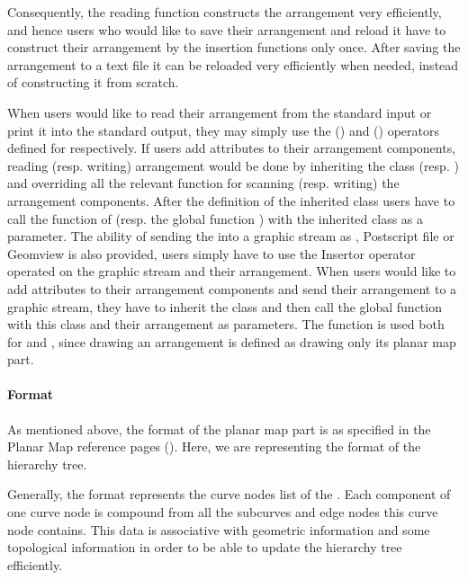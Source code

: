 \begin{ccAdvanced}
Consequently, the reading function constructs the arrangement very 
efficiently, and hence users who would like to save their arrangement and 
reload it have to construct their  arrangement by the insertion functions 
only once. After saving the arrangement to a text file it can be reloaded 
very efficiently when needed, instead of constructing it from scratch.

When users would like to read their arrangement from the standard input or 
print it into the standard output, they may simply use the  
(\ccc{ >> }) and  (\ccc{ << }) operators defined for 
 respectively. 
If users add attributes to their arrangement components, reading (resp. 
writing) arrangement would be done by inheriting the class 
  (resp.  ) 
and overriding all the relevant function for scanning (resp. writing) the 
arrangement components. After the definition of the inherited class users 
have to call the function  of  (resp. the 
global function  ) with the inherited class as a parameter.
The ability of sending the  into a graphic stream as 
, Postscript file or Geomview is also provided, 
users simply have to use the Insertor operator operated on the graphic 
stream and their arrangement. When users would like to add attributes to 
their arrangement components and send their arrangement to a graphic stream, 
they have to inherit the class  and then call the global 
function  with this class and their arrangement as parameters.
The function   is used both for  and 
, since drawing an arrangement is defined as drawing only 
its planar map part.

\paragraph{Format}
As mentioned above, the format of the planar map part is as specified 
in the Planar Map reference pages (). 
Here, we are representing the format of the hierarchy tree.

Generally, the format represents the curve nodes list of the 
. Each component of one curve node is compound from all the 
subcurves and edge nodes this curve node contains. This data is associative 
with geometric information and some topological information in order to be 
able to update the hierarchy tree efficiently. 


\end{ccAdvanced}
